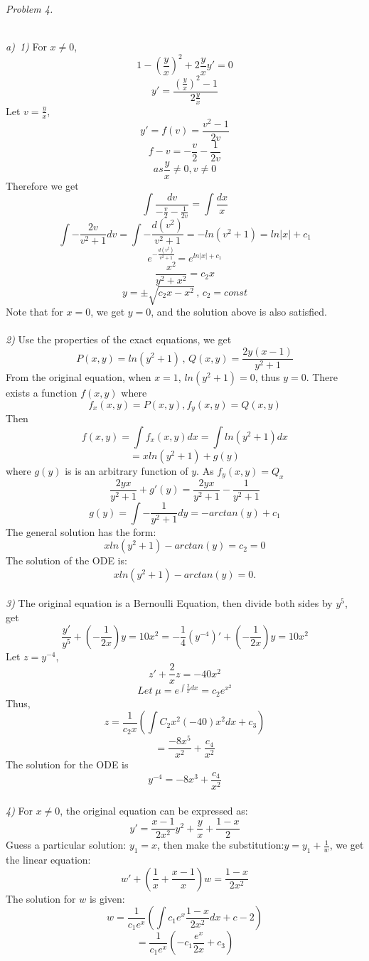 \documentclass{article}
\begin{document}
\vspace{2em}
\par
\begin{Large}
\textit{Problem 4.}
\end{Large}
\vspace{0.5em}
\\
\textit{a)}\,\,\,\textit{1)} For $x\neq 0$, 
$$1-(\frac{y}{x})^2+2\frac{y}{x}y'=0$$
$$y'=\frac{(\frac{y}{x})^2-1}{2\frac{y}{x}}$$
Let $v=\frac{y}{x}$,
$$y'=f(v)=\frac{v^2-1}{2v}$$
$$f-v=-\frac{v}{2}-\frac{1}{2v}$$
$$as \frac{y}{x}\neq 0, v\neq 0$$
Therefore we get
$$\int\frac{dv}{-\frac{v}{2}-\frac{1}{2v}}=\int\frac{dx}{x}$$
$$\int -\frac{2v}{v^2+1}dv=\int-\frac{d(v^2)}{v^2+1}=-ln(v^2+1)=ln|x|+c_1$$
$$e^{-\frac{d(v^2)}{v^2+1}}=e^{ln|x|+c_1}$$
$$\frac{x^2}{y^2+x^2}=c_2x$$
$$y=\pm\sqrt{c_2x-x^2}\,,\,c_2=const$$
Note that for $x=0$, we get $y=0$, and the solution above is also satisfied.\\
\\
\textit{2)}\,\,Use the properties of the exact equations, we get
$$P(x,y)=ln(y^2+1)\,,\,Q(x,y)=\frac{2y(x-1)}{y^2+1}$$
From the original equation, when $x=1$, $ln(y^2+1)=0$, thus $y=0$.
There exists a function $f(x,y)$ where 
$$f_x(x,y)=P(x,y),f_y(x,y)=Q(x,y)$$
Then
$$f(x,y)=\int f_x(x,y)dx=\int  ln(y^2+1)dx$$
$$=xln(y^2+1)+g(y)$$
where $g(y)$ is is an arbitrary function of $y$.
As $f_y(x,y)=Q_x$
$$\frac{2yx}{y^2+1}+g'(y)=\frac{2yx}{y^2+1}-\frac{1}{y^2+1}$$
$$g(y)=\int-\frac{1}{y^2+1}dy=-arctan(y)+c_1$$
The general solution has the form:
$$xln(y^2+1)-arctan(y)=c_2=0$$
The solution of the ODE is:
$$xln(y^2+1)-arctan(y)=0.$$
\\
\textit{3)}\,\,The original equation is a Bernoulli Equation, then divide both sides by $y^5$, get
$$\frac{y'}{y^5}+(-\frac{1}{2x})y=10x^2=-\frac{1}{4}(y^{-4})'+(-\frac{1}{2x})y=10x^2$$
Let $z=y^{-4}$,
$$z'+\frac{2}{x}z=-40x^2$$
$$Let\; \mu=e^{\int\frac{2}{x}dx}=c_2e^{x^2}$$
Thus,
$$z=\frac{1}{c_2x}(\int C_2x^2(-40)x^2dx+c_3)$$
$$=\frac{-8x^5}{x^2}+\frac{c_4}{x^2}$$
The solution for the ODE is
$$y^{-4}=-8x^3+\frac{c_4}{x^2}$$
\\
\textit{4)}\,\,For $x\neq 0$, the original equation can be expressed as:
$$y'=\frac{x-1}{2x^2}y^2+\frac{y}{x}+\frac{1-x}{2}$$
Guess a particular solution: $y_1=x$, then make the substitution:$y=y_1+\frac{1}{w}$, we get the linear equation:
$$w'+(\frac{1}{x}+\frac{x-1}{x})w=\frac{1-x}{2x^2}$$
The solution for $w$ is given:
$$w=\frac{1}{c_1e^x}(\int c_1e^x\frac{1-x}{2x^2}dx+c-2)$$
$$=\frac{1}{c_1e^x}(-c_1\frac{e^x}{2x}+c_3)$$
\end{document}
